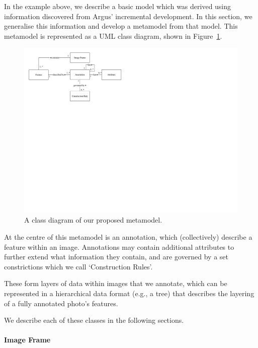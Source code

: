 
In the example above, we describe a basic model which was derived using information discovered from Argus' incremental development. In this section, we generalise this information and develop a metamodel from that model. This metamodel is represented as a UML class diagram, shown in Figure~\ref{fig:dataset:metamodel_class_diagram}.

\begin{figure}[h]
  \centering
  \includegraphics[width=\textwidth]{images/dataset/metamodel_class_diagram}
  \caption[Class diagram of our proposed metamodel]{A class diagram of our proposed metamodel.}
  \label{fig:dataset:metamodel_class_diagram}
\end{figure}

At the centre of this metamodel is an annotation, which (collectively) describe a feature within an image. Annotations may contain additional attributes to further extend what information they contain, and are governed by a set constrictions which we call `Construction Rules'.

These form layers of data within images that we annotate, which can be represented in a hierarchical data format (e.g., a tree) that describes the layering of a fully annotated photo's features.

We describe each of these classes in the following sections.

\paragraph{Image Frame}

